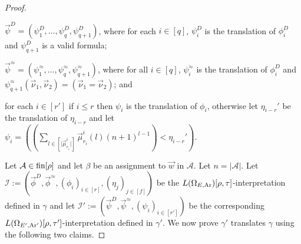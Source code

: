 \documentclass[../main/thesis.tex]{subfiles}
\begin{document}
\begin{proof}
\begin{myitemize}
  \item $\vec{\psi}^D = (\psi^D_1, \ldots, \psi^D_{q}, \psi^D_{q+1})$, where for
    each $i \in [q]$, $\psi^D_i$ is the translation of $\phi^D_i$ and
    $\psi^D_{q+1}$ is a valid formula;
  \item $\vec{\psi}^{\approx} = (\psi^{\approx}_1, \ldots, \psi^{\approx}_q,
    \psi^{\approx}_{q+1})$, where for all $i \in [q]$, $\psi^{\approx}_i$ is the
    translation of $\phi^D_i$ and $\psi^{\approx}_{q+1}(\vec{\nu}_1,
    \vec{\nu}_2) = (\vec{\nu}_1 = \vec{\nu}_2)$; and
  \item for each $i \in [r']$ if $i \leq r$ then $\psi_i$ is the translation of
    $\phi_i$, otherwise let $\eta_{i - r}'$ be the translation of $\eta_{i - r}$
    and let $\psi_i = ((\sum_{l \in [\vert \vec{\mu}^i_{r_i} \vert]}
    \vec{\mu}^i_{r_{i}}(l)(n+1)^{l-1}) < \eta_{i-r}')$.
  \end{myitemize}

  Let $\mathcal{A} \in \text{\upshape fin}[\rho]$ and let $\beta$ be an assignment to $\vec{w}$
  in $\mathcal{A}$. Let $n = \vert \mathcal{A} \vert$. Let $\mathcal{I} :=
  (\vec{\phi}^D, \vec{\phi}^{\approx}, (\phi_i)_{i \in [r]}, (\eta_j)_{j \in
    [f]})$ be the $L(\Omega_{E, \text{\upshape Ar}})[\rho, \tau]$-interpretation defined in
  $\gamma$ and let $\mathcal{I}' := (\vec{\psi}^D, \vec{\psi}^{\approx},
  (\psi_i)_{i \in [r']})$ be the corresponding $L(\Omega_{E', \text{\upshape Ar}'})[\rho,
  \tau']$-interpretation defined in $\gamma'$. We now prove $\gamma'$ translates
  $\gamma$ using the following two claims.



\end{proof}
\end{document}
